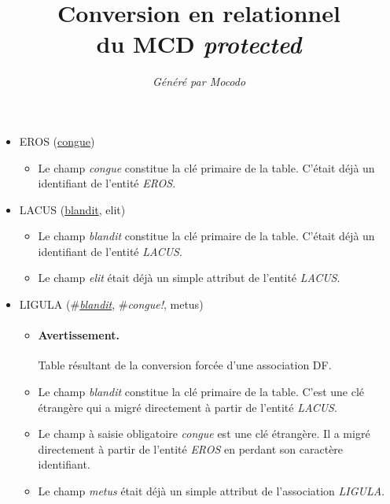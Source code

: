 \documentclass[a4paper]{article}
\title{Conversion en relationnel\\du MCD \emph{protected}}
\author{\emph{Généré par Mocodo}}
\newcommand{\relat}[1]{\textsc{#1}}
\newcommand{\attr}[1]{#1}
\newcommand{\prim}[1]{\uline{#1}}
\newcommand{\foreign}[1]{\#\textsl{#1}}
\begin{document}
\maketitle

\begin{itemize}
  \item \relat{EROS} (\prim{congue})
  \begin{itemize}
    \item Le champ \emph{congue} constitue la clé primaire de la table. C'était déjà un identifiant de l'entité \emph{EROS}.
  \end{itemize}

  \item \relat{LACUS} (\prim{blandit}, \attr{elit})
  \begin{itemize}
    \item Le champ \emph{blandit} constitue la clé primaire de la table. C'était déjà un identifiant de l'entité \emph{LACUS}.
    \item Le champ \emph{elit} était déjà un simple attribut de l'entité \emph{LACUS}.
  \end{itemize}

  \item \relat{LIGULA} (\foreign{\prim{blandit}}, \foreign{congue!}, \attr{metus})
  \begin{itemize}
    \item \paragraph{Avertissement.} Table résultant de la conversion forcée d'une association DF.
    \item Le champ \emph{blandit} constitue la clé primaire de la table. C'est une clé étrangère qui a migré directement à partir de l'entité \emph{LACUS}.
    \item Le champ à saisie obligatoire \emph{congue} est une clé étrangère. Il a migré directement à partir de l'entité \emph{EROS} en perdant son caractère identifiant.
    \item Le champ \emph{metus} était déjà un simple attribut de l'association \emph{LIGULA}.
  \end{itemize}

\end{itemize}
\end{document}
